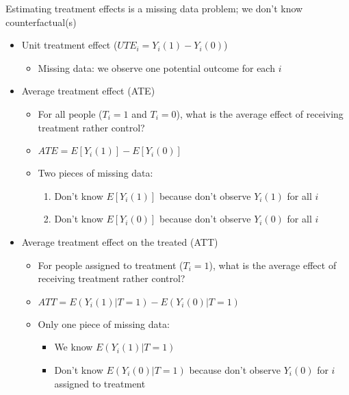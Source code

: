 \begin{frame}{Estimating treatment effects is a missing data problem; we don't know counterfactual(s)}{}

	\begin{itemize}
		\item Unit treatment effect ($UTE_i=Y_i(1)-Y_i(0)$)
		\begin{itemize}
			\item Missing data: we observe one potential outcome for each $i$
		\end{itemize}			
		
		\item Average treatment effect (ATE)
		\begin{itemize}
			\item For all people ($T_i=1$ and $T_i=0$), what is the average effect of receiving treatment rather control?
			\item $ATE=E[Y_i(1)] - E[Y_i(0)] $
			\item Two pieces of missing data:
			\begin{enumerate}
				\item Don't know $E[Y_i(1)]$ because don't observe $Y_i(1)$ for all $i$
				\item Don't know $E[Y_i(0)]$ because don't observe $Y_i(0)$ for all $i$
			\end{enumerate} 
		\end{itemize}
		\item Average treatment effect on the treated (ATT)
		\begin{itemize}
			\item For people assigned to treatment ($T_i=1$), what is the average effect of receiving treatment rather control?
			\item $ ATT=E(Y_i(1)|T=1)-E(Y_i(0)|T=1) $
			\item Only one piece of missing data:
			\begin{itemize}
				\item We know $E(Y_i(1)|T=1)$
				\item Don't know $E(Y_i(0)|T=1) $ because don't observe $Y_i(0) $  for $i$ assigned to treatment
			\end{itemize}
			
		\end{itemize}
	\end{itemize}	
\end{frame}

